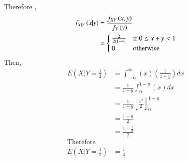 \documentclass[journal,12pt,twocolumn]{IEEEtran}
\begin{document}
Therefore ,
\begin{align}
    f_{X|Y}\left(x|y\right) &= \frac{f_{XY}\left(x,y\right)}{f_Y\left(y\right)}\\
    & = 
    \begin{cases}
    \frac{2}{2(1-y)} & \text{if } 0\leq x+y < 1\\
    0 & \text{otherwise}
    \end{cases}
\end{align}
Then, 
\begin{align}
   E(X|Y= \frac{1}{2}) & =
   \int_{-\infty}^{\infty} (x)(\frac{1}{1-y})dx\\
    & = \frac{1}{1-y} \int_{0}^{1-y}(x)dx\\
    & = \frac{1}{1-y} \left[ \frac{x^2}{2} \right]_{0}^{1-y} \\
    & = \frac{1-y}{2}\\
    & = \frac{1-\frac{1}{2}}{2}\\
    \text{Therefore}\\
   E(X|Y=\frac{1}{2}) & = \frac{1}{4}
\end{align}
\end{document}
